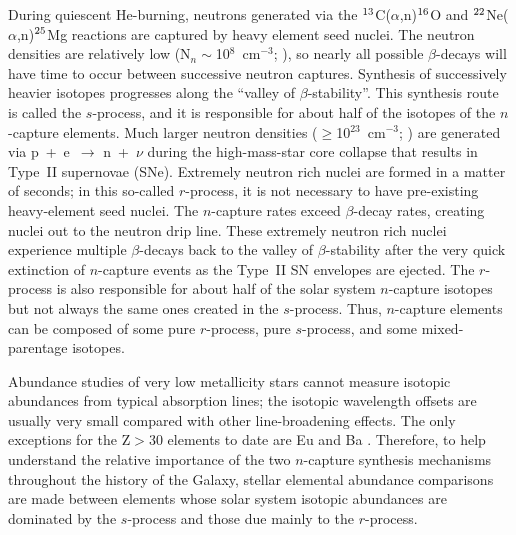 \documentclass[12pt,preprint]{aastex}
\newcommand\iso[2]{$^{\rm #1}$#2}
\begin{document}
During quiescent He-burning, neutrons generated via the  \iso{13}{C}($\alpha$,n)\iso{16}{O} and \iso{22}{Ne}($\alpha$,n)\iso{25}{Mg} reactions are captured by heavy element seed nuclei.  The neutron densities are relatively low (N$_n\sim$10$^{8}$~cm$^{-3}$; \citealt{Pagel1997}), so nearly all possible $\beta$-decays will have time to occur between successive neutron captures.  Synthesis of successively heavier isotopes progresses along the ``valley of $\beta$-stability''.  This synthesis route is called the $s$-process, and it is responsible for about half of the isotopes of the $n$-capture elements.  Much larger neutron densities ($\geq$10$^{23}$~cm$^{-3}$; \citealt{Pagel1997}) 
are generated via p~+~e~$\rightarrow$ n~+~$\nu$ during the high-mass-star core collapse that results in Type~II supernovae (SNe).  Extremely neutron rich nuclei are formed in a matter of seconds; in this so-called $r$-process, it is not necessary to have pre-existing heavy-element seed nuclei.  The $n$-capture rates exceed $\beta$-decay rates, creating nuclei out to the neutron drip line.  These extremely neutron rich nuclei experience multiple $\beta$-decays back to the valley of $\beta$-stability after the very quick extinction of $n$-capture events as the Type~II SN envelopes are ejected.  The $r$-process is also responsible for about half of the solar system
$n$-capture isotopes but not always the same ones created in the $s$-process.
Thus, $n$-capture elements can be composed of some pure $r$-process, pure $s$-process, and some mixed-parentage isotopes.

Abundance studies of very low metallicity stars cannot measure isotopic abundances from typical absorption lines; the isotopic wavelength offsets are usually very small compared with other line-broadening effects. The only exceptions for the Z$>$30 elements to date are Eu \citep{Sneden2002, Aoki2003} and Ba \citep{Magain1995, Lambert2002}.  Therefore, to help understand the relative importance of the two $n$-capture synthesis mechanisms throughout the history of the Galaxy, stellar elemental abundance comparisons are made between elements whose solar system isotopic abundances are dominated by the $s$-process and those due mainly to the $r$-process.
\end{document}
